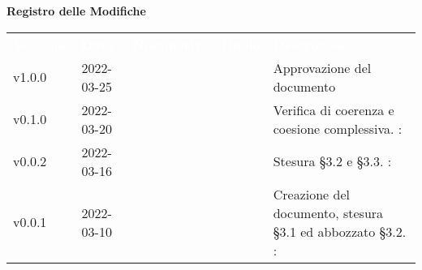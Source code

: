 

{\LARGE{\textbf{Registro delle Modifiche}}} \\
\begin{table}[!htbp]
\renewcommand{\arraystretch}{1.5}
\begin{tabular}{ m{}<{\centering}  m{}<{\centering}  m{}<{\centering}  m{}<{\centering}  m{}<{\centering} }
	\rowcolor{darkblue}
	\textcolor{white}{\textbf{Versione}} &\textcolor{white}{\textbf{Data}}& \textcolor{white}{\textbf{Nominativo}} & \textcolor{white}{\textbf{Ruolo}}&\textcolor{white}{\textbf{Descrizione}}\\ 

	v1.0.0 & 2022-03-25 & \MG & \RE & Approvazione del documento \\

	v0.1.0& 2022-03-20 & \FP & \AN & Verifica di coerenza e coesione complessiva. \VE: \textit{\PV}\\

	v0.0.2& 2022-03-16 & \FP &\AN & Stesura \S{}3.2 e \S{}3.3. \VE: \textit{\PV}\\

	v0.0.1& 2022-03-10 & \GC &\AN & Creazione del documento, stesura \S{}3.1 ed abbozzato \S{}3.2. \VE: \textit{\PV}\\

\end{tabular}
\end{table}

\pagebreak